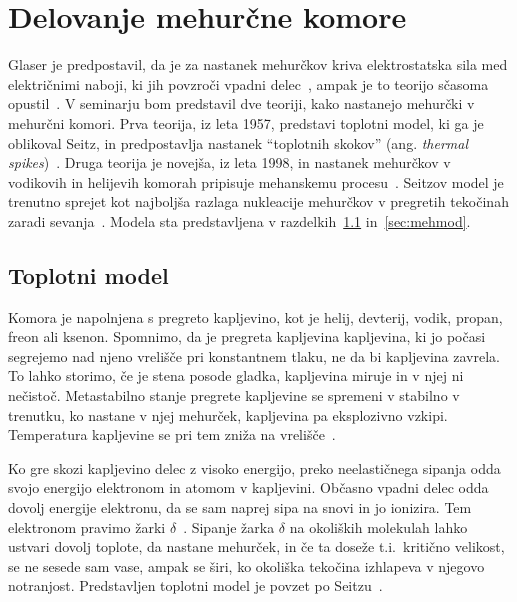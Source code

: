 \section{Delovanje mehurčne komore}

Glaser je predpostavil, da je za nastanek mehurčkov kriva elektrostatska sila med električnimi naboji, ki jih povzroči vpadni delec~\cite{glaser_bubble_1958}, ampak je to teorijo sčasoma opustil~\cite{seitz_theory_1958}. V seminarju bom predstavil dve teoriji, kako nastanejo mehurčki v mehurčni komori. Prva teorija, iz leta 1957, predstavi toplotni model, ki ga je oblikoval Seitz, in predpostavlja nastanek ``toplotnih skokov'' (ang. \textit{thermal spikes})~\cite{seitz_theory_1958}. Druga teorija je novejša, iz leta 1998, in nastanek mehurčkov v vodikovih in helijevih komorah pripisuje mehanskemu procesu~\cite{konstantinov_how_1998}. Seitzov model je trenutno sprejet kot najboljša razlaga nukleacije mehurčkov v pregretih tekočinah zaradi sevanja~\cite{bruno_critical_2019}. Modela sta predstavljena v razdelkih~\ref{sec:topmod} in~\ref{sec:mehmod}.

\subsection{Toplotni model}\label{sec:topmod}

Komora je napolnjena s pregreto kapljevino, kot je helij, devterij, vodik, propan, freon ali ksenon. Spomnimo, da je pregreta kapljevina kapljevina, ki jo počasi segrejemo nad njeno vrelišče pri konstantnem tlaku, ne da bi kapljevina zavrela. To lahko storimo, če je stena posode gladka, kapljevina miruje in v njej ni nečistoč. Metastabilno stanje pregrete kapljevine se spremeni v stabilno v trenutku, ko nastane v njej mehurček, kapljevina pa eksplozivno vzkipi. Temperatura kapljevine se pri tem zniža na vrelišče~\cite{strnad_fizika_2016}.

Ko gre skozi kapljevino delec z visoko energijo, preko neelastičnega sipanja odda svojo energijo elektronom in atomom v kapljevini. Občasno vpadni delec odda dovolj energije elektronu, da se sam naprej sipa na snovi in jo ionizira. Tem elektronom pravimo žarki \( \delta \)~\cite{seitz_theory_1958, glaser_bubble_1958}. Sipanje žarka \( \delta \) na okoliških molekulah lahko ustvari dovolj toplote, da nastane mehurček, in če ta doseže t.i.\ kritično velikost, se ne sesede sam vase, ampak se širi, ko okoliška tekočina izhlapeva v njegovo notranjost. Predstavljen toplotni model je povzet po Seitzu~\cite{seitz_theory_1958}.

